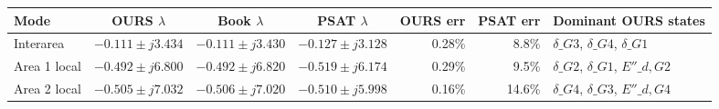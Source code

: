 \begingroup\scriptsize\setlength{\tabcolsep}{3pt}
\begin{tabular}{l c c c r r l}\toprule
Mode & OURS $\lambda$ & Book $\lambda$ & PSAT $\lambda$ & OURS err & PSAT err & Dominant OURS states\\\midrule
Interarea & $-0.111\pm j3.434$ & $-0.111\pm j3.430$ & $-0.127\pm j3.128$ & 0.28\% & 8.8\% & $\delta\_{G3}$, $\delta\_{G4}$, $\delta\_{G1}$\\
Area 1 local & $-0.492\pm j6.800$ & $-0.492\pm j6.820$ & $-0.519\pm j6.174$ & 0.29\% & 9.5\% & $\delta\_{G2}$, $\delta\_{G1}$, $E''\_{d,G2}$\\
Area 2 local & $-0.505\pm j7.032$ & $-0.506\pm j7.020$ & $-0.510\pm j5.998$ & 0.16\% & 14.6\% & $\delta\_{G4}$, $\delta\_{G3}$, $E''\_{d,G4}$\\
\bottomrule\end{tabular}\endgroup
